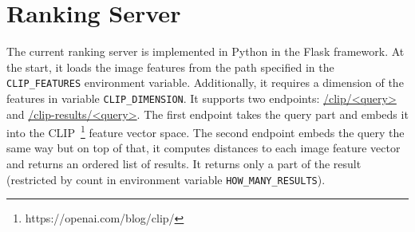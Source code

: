 \chapter{Ranking Server}
\label{comp-ranking-server}

The current ranking server is implemented in Python in the Flask framework. At the start, it loads the image features from the path specified in the \lstinline{CLIP_FEATURES} environment variable. Additionally, it requires a dimension of the features in variable \lstinline{CLIP_DIMENSION}. It supports two endpoints: \url{/clip/<query>} and \url{/clip-results/<query>}. The first endpoint takes the query part and embeds it into the CLIP~\footnote{https://openai.com/blog/clip/} feature vector space. The second endpoint embeds the query the same way but on top of that, it computes distances to each image feature vector and returns an ordered list of results. It returns only a part of the result (restricted by count in environment variable \lstinline{HOW_MANY_RESULTS}).
